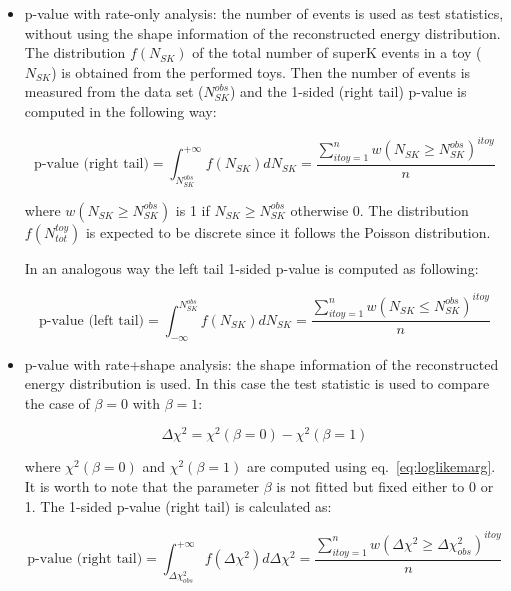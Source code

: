 \begin{itemize}

\item p-value with rate-only analysis: the number of events is used as test statistics, without using the shape information of the reconstructed energy 
	distribution. The distribution $f(N_{SK})$ of the total number of superK events in a toy ($N_{SK}$) is obtained from the performed toys. 
	Then the number of events is measured from the data set ($N_{SK}^{obs}$) and
	the 1-sided (right tail) p-value is computed in the following way: 	
	
	\begin{equation}
	\text{p-value (right tail)} = \int_{N_{SK}^{obs}}^{+\infty} f(N_{SK}) d N_{SK}  = 
		\frac{ \sum_{ itoy=1 }^{n} w(N_{SK} \geq N_{SK}^{obs} )^{itoy} }{ n }
	\label{eq:pvalue_rateonly}
	\end{equation}
	
	where $w(N_{SK} \geq N_{SK}^{obs})$ is 1 if $N_{SK} \geq N_{SK}^{obs}$ otherwise 0.
	The distribution $f(N_{tot}^{toy})$ is expected to be discrete since it follows the Poisson distribution.
			 
	In an analogous way the left tail 1-sided p-value is computed as following:
		
	\begin{equation}
	\text{p-value (left tail)} = \int^{N_{SK}^{obs}}_{-\infty} f(N_{SK}) d N_{SK}  = 
		\frac{ \sum_{ itoy=1 }^{n} w(N_{SK} \leq N_{SK}^{obs} )^{itoy} }{ n }
	\label{eq:pvalue_rateonly}
	\end{equation}
		 
\item p-value with rate+shape analysis: the shape information of the reconstructed energy distribution is used.
	In this case the test statistic is used to compare the case of $\beta=0$ with $\beta=1$:
	
	\begin{equation}
	\Delta \chi^2 = \chi^2(\beta=0) - \chi^2(\beta=1)
	\label{eq:deltachisq_rateshape}
	\end{equation}

	where $\chi^2(\beta=0)$ and $\chi^2(\beta=1)$ are computed using eq.~\ref{eq:loglikemarg}.
	It is worth to note that the parameter $\beta$ is not fitted but fixed either to 0 or 1.
	The 1-sided p-value (right tail) is calculated as:

	\begin{equation}
	\text{p-value (right tail)} = \int_{\Delta \chi^2_{obs}}^{+\infty} f(\Delta \chi^2) d \Delta \chi^2  = 
		\frac{ \sum_{ itoy=1 }^{n} w(\Delta \chi^2 \geq \Delta \chi^2_{obs} )^{itoy} }{ n }
	\label{eq:pvalue_rateonly}
	\end{equation}
	

\end{itemize}
